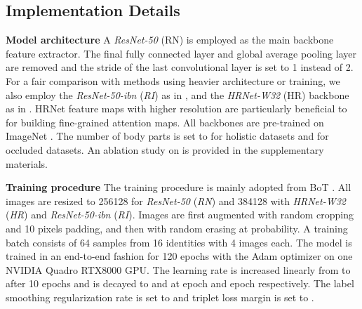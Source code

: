 \documentclass[10pt,twocolumn,letterpaper]{article}
\begin{document}
\subsection{Implementation Details} \label{section:implementation}
\textbf{Model architecture}
A \textit{ResNet-50} (RN) \cite{resnet} is employed as the main backbone feature extractor.
The final fully connected layer and global average pooling layer are removed and the stride of the last convolutional layer is set to 1 instead of 2.
For a fair comparison with methods using heavier architecture or training, we also employ the  \textit{ResNet-50-ibn} (\textit{RI}) \cite{ibn} as in \cite{fastreid, LDS, OPReID}, and the \textit{HRNet-W32} (HR) \cite{hrnet} backbone as in \cite{ISP}. HRNet feature maps with higher resolution are particularly beneficial to {\model} for building fine-grained attention maps.
All backbones are pre-trained on ImageNet \cite{imagenet}.
The number of body parts  is set to  for holistic datasets and  for occluded datasets.
An ablation study on  is provided in the supplementary materials.





\textbf{Training procedure}
The training procedure is mainly adopted from BoT \cite{BoT}.
All images are resized to 256128 for \textit{ResNet-50} (\textit{RN}) and 384128 with \textit{HRNet-W32} (\textit{HR}) and \textit{ResNet-50-ibn} (\textit{RI}). Images are first augmented with random cropping and 10 pixels padding, and then with random erasing \cite{random-erasing} at  probability. A training batch consists of 64 samples from 16 identities with 4 images each.
The model is trained in an end-to-end fashion for 120 epochs with the Adam optimizer on one NVIDIA Quadro RTX8000 GPU. 
The learning rate is increased linearly from  to  after 10 epochs and is decayed to  and  at  epoch and  epoch respectively.
The label smoothing regularization rate  is set to  and triplet loss margin  is set to .
\end{document}
